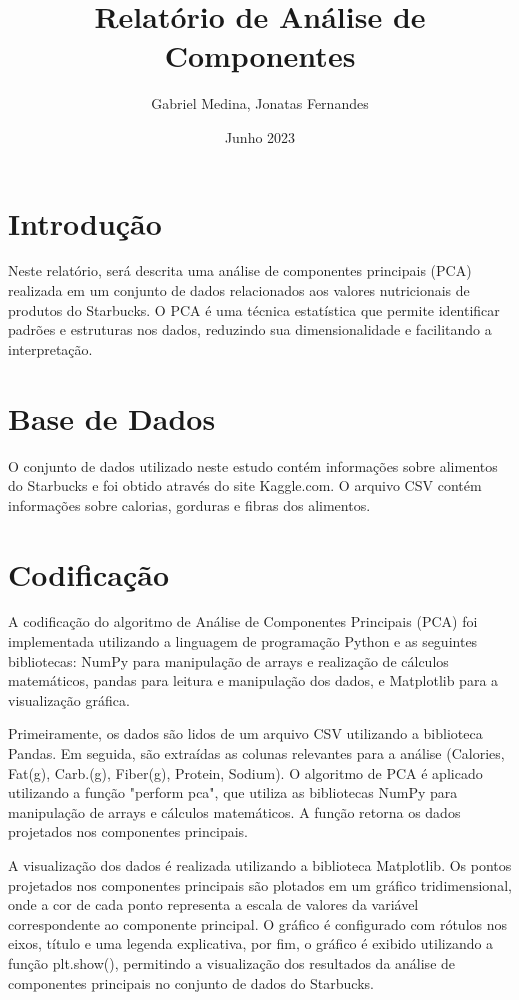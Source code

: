 \documentclass[12pt,a4]{article}
\title{Relatório de Análise de Componentes}
\author{Gabriel Medina, Jonatas Fernandes}
\date{Junho 2023}
\begin{document}
\maketitle

\section{Introdução}
Neste relatório, será descrita uma análise de componentes principais (PCA) realizada em um conjunto de dados relacionados aos valores nutricionais de produtos do Starbucks. O PCA é uma técnica estatística que permite identificar padrões e estruturas nos dados, reduzindo sua dimensionalidade e facilitando a interpretação.

\section{Base de Dados}
O conjunto de dados utilizado neste estudo contém informações sobre alimentos do Starbucks e foi obtido através do site Kaggle.com. O arquivo CSV contém informações sobre calorias, gorduras e fibras dos alimentos.

\section{Codificação}
A codificação do algoritmo de Análise de Componentes Principais (PCA) foi implementada utilizando a linguagem de programação Python e as seguintes bibliotecas: NumPy para manipulação de arrays e realização de cálculos matemáticos, pandas para leitura e manipulação dos dados, e Matplotlib para a visualização gráfica.
\begin{flushleft}
Primeiramente, os dados são lidos de um arquivo CSV utilizando a biblioteca Pandas. Em seguida, são extraídas as colunas relevantes para a análise (Calories, Fat(g), Carb.(g), Fiber(g), Protein, Sodium). O algoritmo de PCA é aplicado utilizando a função "perform pca", que utiliza as bibliotecas NumPy para manipulação de arrays e cálculos matemáticos. A função retorna os dados projetados nos componentes principais.
\end{flushleft}

\begin{flushleft}
A visualização dos dados é realizada utilizando a biblioteca Matplotlib. Os pontos projetados nos componentes principais são plotados em um gráfico tridimensional, onde a cor de cada ponto representa a escala de valores da variável correspondente ao componente principal. O gráfico é configurado com rótulos nos eixos, título e uma legenda explicativa, por fim, o gráfico é exibido utilizando a função plt.show(), permitindo a visualização dos resultados da análise de componentes principais no conjunto de dados do Starbucks.
\end{flushleft}
\end{document}
